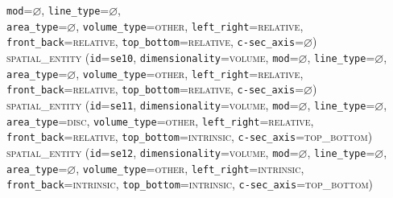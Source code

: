 \documentclass[11pt]{article}
\begin{document}
{            \texttt{mod}=$\varnothing$,
            \texttt{line\_type}=$\varnothing$,\\
            \texttt{area\_type}=$\varnothing$,
            \texttt{volume\_type}=\textsc{other},
            \texttt{left\_right}=\textsc{relative},\\
            \texttt{front\_back}=\textsc{relative},
            \texttt{top\_bottom}=\textsc{relative},
            \texttt{c-sec\_axis}=$\varnothing$)\vspace{0.5em}\\
        \textsc{spatial\_entity}
            (\texttt{id}=\texttt{se10},
            \texttt{dimensionality}=\textsc{volume},
            \texttt{mod}=$\varnothing$,
            \texttt{line\_type}=$\varnothing$,\\
            \texttt{area\_type}=$\varnothing$,
            \texttt{volume\_type}=\textsc{other},
            \texttt{left\_right}=\textsc{relative},\\
            \texttt{front\_back}=\textsc{relative},
            \texttt{top\_bottom}=\textsc{relative},
            \texttt{c-sec\_axis}=$\varnothing$)\vspace{0.5em}\\
        \textsc{spatial\_entity}
            (\texttt{id}=\texttt{se11},
            \texttt{dimensionality}=\textsc{volume},
            \texttt{mod}=$\varnothing$,
            \texttt{line\_type}=$\varnothing$,\\
            \texttt{area\_type}=\textsc{disc},
            \texttt{volume\_type}=\textsc{other},
            \texttt{left\_right}=\textsc{relative},\\
            \texttt{front\_back}=\textsc{relative},
            \texttt{top\_bottom}=\textsc{intrinsic},
            \texttt{c-sec\_axis}=\textsc{top\_bottom})\vspace{0.5em}\\
        \textsc{spatial\_entity}
            (\texttt{id}=\texttt{se12},
            \texttt{dimensionality}=\textsc{volume},
            \texttt{mod}=$\varnothing$,
            \texttt{line\_type}=$\varnothing$,\\
            \texttt{area\_type}=$\varnothing$,
            \texttt{volume\_type}=\textsc{other},
            \texttt{left\_right}=\textsc{intrinsic},\\
            \texttt{front\_back}=\textsc{intrinsic},
            \texttt{top\_bottom}=\textsc{intrinsic},
            \texttt{c-sec\_axis}=\textsc{top\_bottom})\vspace{0.5em}\\
}
\end{document}
